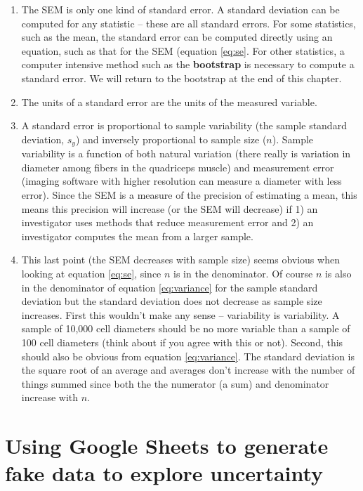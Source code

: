\documentclass[]{book}
\providecommand{\tightlist}{%
  \setlength{\itemsep}{0pt}\setlength{\parskip}{0pt}}
\theoremstyle{definition}
\theoremstyle{definition}
\theoremstyle{definition}
\theoremstyle{remark}
\begin{document}
\begin{enumerate}
\def\labelenumi{\arabic{enumi}.}
\tightlist
\item
  The SEM is only one kind of standard error. A standard deviation can
  be computed for any statistic -- these are all standard errors. For
  some statistics, such as the mean, the standard error can be computed
  directly using an equation, such as that for the SEM (equation
  \eqref{eq:se}. For other statistics, a computer intensive method such as
  the \textbf{bootstrap} is necessary to compute a standard error. We
  will return to the bootstrap at the end of this chapter.
\item
  The units of a standard error are the units of the measured variable.
\item
  A standard error is proportional to sample variability (the sample
  standard deviation, \(s_y\)) and inversely proportional to sample size
  (\(n\)). Sample variability is a function of both natural variation
  (there really is variation in diameter among fibers in the quadriceps
  muscle) and measurement error (imaging software with higher resolution
  can measure a diameter with less error). Since the SEM is a measure of
  the precision of estimating a mean, this means this precision will
  increase (or the SEM will decrease) if 1) an investigator uses methods
  that reduce measurement error and 2) an investigator computes the mean
  from a larger sample.
\item
  This last point (the SEM decreases with sample size) seems obvious
  when looking at equation \eqref{eq:se}, since \(n\) is in the
  denominator. Of course \(n\) is also in the denominator of equation
  \eqref{eq:variance} for the sample standard deviation but the standard
  deviation does not decrease as sample size increases. First this
  wouldn't make any sense -- variability is variability. A sample of
  10,000 cell diameters should be no more variable than a sample of 100
  cell diameters (think about if you agree with this or not). Second,
  this should also be obvious from equation \eqref{eq:variance}. The
  standard deviation is the square root of an average and averages don't
  increase with the number of things summed since both the the numerator
  (a sum) and denominator increase with \(n\).
\end{enumerate}

\section{Using Google Sheets to generate fake data to explore
uncertainty}\label{using-google-sheets-to-generate-fake-data-to-explore-uncertainty}
\end{document}
